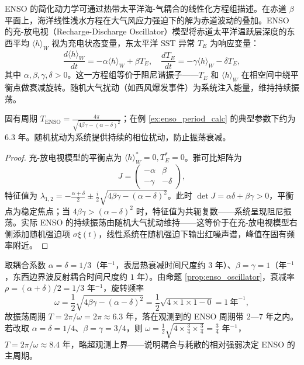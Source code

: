 \begin{proposition}\label{prop:enso_oscillator}
ENSO 的简化动力学可通过热带太平洋海-气耦合的线性化方程组描述。在赤道 $\beta$ 平面上，海洋线性浅水方程在大气风应力强迫下的解为赤道波动的叠加。ENSO 的充-放电视（Recharge-Discharge Oscillator）模型将赤道太平洋温跃层深度的东西平均 $\langle h \rangle_W$ 视为充电状态变量，东太平洋 SST 异常 $T_E$ 为响应变量：
\[
\frac{d\langle h \rangle_W}{dt} = -\alpha \langle h \rangle_W + \beta T_E, \quad \frac{dT_E}{dt} = -\gamma \langle h \rangle_W - \delta T_E,
\]
其中 $\alpha, \beta, \gamma, \delta > 0$。这一方程组等价于阻尼谐振子——$T_E$ 和 $\langle h \rangle_W$ 在相空间中绕平衡点做衰减旋转。随机大气扰动（如西风爆发事件）为系统注入能量，维持持续振荡。

固有周期 $T_{\text{ENSO}} = \frac{4\pi}{\sqrt{4\beta\gamma - (\alpha-\delta)^2}}$；在例 \ref{ex:enso_period_calc} 的典型参数下约为 $6.3$ 年。随机扰动为系统提供持续的相位扰动，防止振荡衰减。
\end{proposition}

\begin{proof}
充-放电视模型的平衡点为 $\langle h \rangle_W^* = 0, T_E^* = 0$。雅可比矩阵为
\[
J = \begin{pmatrix} -\alpha & \beta \\ -\gamma & -\delta \end{pmatrix},
\]
特征值为 $\lambda_{1,2} = -\frac{\alpha+\delta}{2} \pm \frac{i}{2}\sqrt{4\beta\gamma - (\alpha-\delta)^2}$。此时 $\det J = \alpha\delta + \beta\gamma > 0$，平衡点为稳定焦点；当 $4\beta\gamma > (\alpha-\delta)^2$ 时，特征值为共轭复数——系统呈现阻尼振荡。实际 ENSO 的持续振荡由随机大气扰动维持——这等价于在充-放电视模型右侧添加随机强迫项 $\sigma \xi(t)$，线性系统在随机强迫下输出红噪声谱，峰值在固有频率附近。
\end{proof}

\begin{example}\label{ex:enso_period_calc}
取耦合系数 $\alpha = \delta = 1/3$（年$^{-1}$，表层热衰减时间尺度约 $3$ 年）、$\beta = \gamma = 1$（年$^{-1}$，东西边界波反射耦合时间尺度约 $1$ 年）。由命题 \ref{prop:enso_oscillator}，衰减率 $\rho = (\alpha+\delta)/2 = 1/3$ 年$^{-1}$，旋转频率
\[
\omega = \frac{1}{2}\sqrt{4\beta\gamma - (\alpha-\delta)^2} = \frac{1}{2}\sqrt{4 \times 1 \times 1 - 0} = 1\ \text{年}^{-1},
\]
故振荡周期 $T = 2\pi/\omega = 2\pi \approx 6.3$ 年，落在观测到的 ENSO 周期带 $2$—$7$ 年之内。若改取 $\alpha = \delta = 1/4$、$\beta = \gamma = 3/4$，则 $\omega = \tfrac12\sqrt{4 \times \tfrac34 \times \tfrac34} = \tfrac34$ 年$^{-1}$，$T = 2\pi/\omega \approx 8.4$ 年，略超观测上界——说明耦合与耗散的相对强弱决定 ENSO 的主周期。
\end{example}

